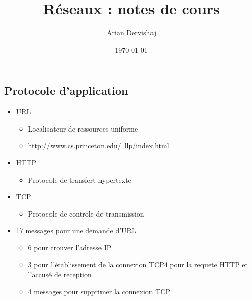 \documentclass[a4paper, 12pt]{article}
\title{Réseaux : notes de cours}
\author{Arian Dervishaj}
\date{\today}
\begin{document}
\maketitle
\pagebreak

\subsection*{Protocole d'application}
\begin{itemize}
    \item URL \begin{itemize}
        \item Localisateur de ressources uniforme
        \item http://www.cs.princeton.edu/~llp/index.html
    \end{itemize}
    \item HTTP \begin{itemize}
        \item Protocole de transfert hypertexte
    \end{itemize}
    \item TCP \begin{itemize}
        \item Protocole de controle de transmission
    \end{itemize}
    \item 17 messages pour une demande d'URL \begin{itemize}
        \item 6 pour trouver l'adresse IP
        \item 3 pour l'établissement de la connexion TCP4 pour la requete HTTP et l'accusé de reception
        \item 4 messages pour supprimer la connexion TCP
    \end{itemize}
\end{itemize}
\end{document}
